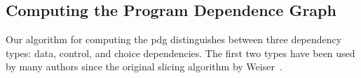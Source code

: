 %
%
%
%
%
%

\subsection{Computing the Program Dependence Graph}

Our algorithm for computing the \ac{pdg} distinguishes between three dependency types: data, control, and choice dependencies.
The first two types have been used by many authors since the original slicing algorithm by Weiser~\cite{weiser_81_program_slicing}.

